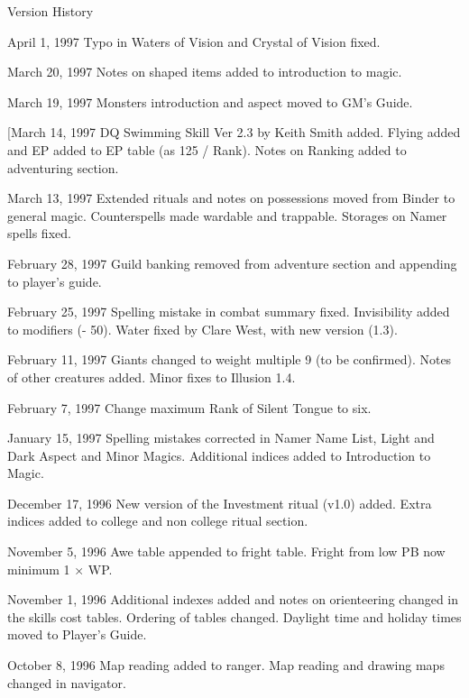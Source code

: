 \begin{Chapter}{Version History}
\begin{Description}
\item[April 1, 1997] Typo in Waters of Vision and Crystal of Vision
  fixed.

\item[March 20, 1997] Notes on shaped items added to introduction to
  magic.

\item[March 19, 1997] Monsters introduction and aspect moved to GM’s
  Guide.

\item[[March 14, 1997] DQ Swimming Skill Ver 2.3 by Keith Smith
  added. Flying added and EP added to EP table (as 125 / Rank). Notes
  on Ranking added to adventuring section.

\item[March 13, 1997] Extended rituals and notes on possessions moved
  from Binder to general magic.  Counterspells made wardable and
  trappable.  Storages on Namer spells fixed.

\item[February 28, 1997] Guild banking removed from adventure section
  and appending to player’s guide.

\item[February 25, 1997] Spelling mistake in combat summary fixed.
  Invisibility added to modifiers (- 50). Water fixed by Clare West,
  with new version (1.3).

\item[February 11, 1997] Giants changed to weight multiple 9 (to be
  confirmed).  Notes of other creatures added. Minor fixes to Illusion
  1.4.

\item[February 7, 1997] Change maximum Rank of Silent Tongue to six.

\item[January 15, 1997] Spelling mistakes corrected in Namer Name
  List, Light and Dark Aspect and Minor Magics.  Additional indices
  added to Introduction to Magic.

\item[December 17, 1996] New version of the Investment ritual (v1.0)
  added.  Extra indices added to college and non college ritual
  section.

\item[November 5, 1996] Awe table appended to fright table. Fright
  from low PB now minimum 1 × WP.

\item[November 1, 1996] Additional indexes added and notes on
  orienteering changed in the skills cost tables.  Ordering of tables
  changed.  Daylight time and holiday times moved to Player’s Guide.

\item[October 8, 1996] Map reading added to ranger. Map reading and
  drawing maps changed in navigator.

\end{Description}

\end{Chapter}
